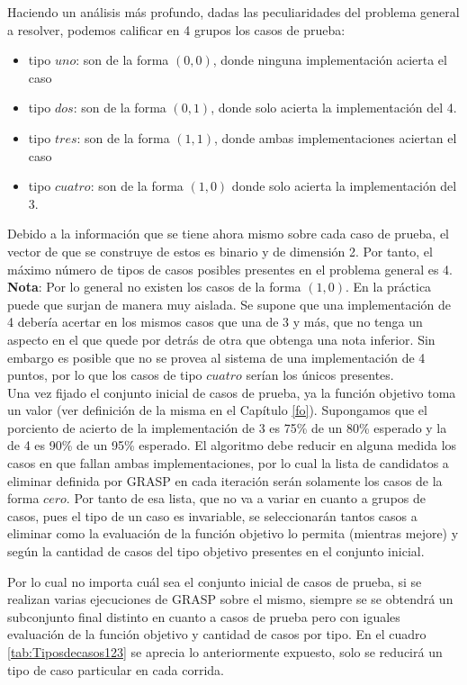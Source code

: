 \documentclass[a4paper,12pt]{book}
\begin{document}
	Haciendo un análisis más profundo, dadas las peculiaridades del problema general a resolver, podemos calificar en 4 grupos los casos de prueba:
	\begin{itemize}
		\item tipo $uno$: son de la forma $(0, 0)$, donde ninguna implementación acierta el caso
		\item tipo $dos$: son de la forma $(0, 1)$, donde solo acierta la implementación del 4.
		\item tipo $tres$: son de la forma $(1, 1)$, donde ambas implementaciones aciertan el caso
		\item tipo $cuatro$: son de la forma $(1, 0)$ donde solo acierta la implementación del 3.
	\end{itemize}

	Debido a la información que se tiene ahora mismo sobre cada caso de prueba, el vector de que se construye de estos es binario y de dimensión 2. Por tanto, el máximo número de tipos de casos posibles presentes en el problema general es 4.\\

	\textbf{Nota}: Por lo general no existen los casos de la forma $(1, 0)$. En la práctica puede que surjan de manera muy aislada. Se supone que una implementación de 4 debería acertar en los mismos casos que una de 3 y más, que no tenga un aspecto en el que quede por detrás de otra que obtenga una nota inferior. Sin embargo es posible que no se provea al sistema de una implementación de 4 puntos, por lo que los casos de tipo $cuatro$ serían los únicos presentes.\\
 
 	Una vez fijado el conjunto inicial de casos de prueba, ya la función objetivo toma un valor (ver definición de la misma en el Capítulo \ref{fo}). Supongamos que el porciento de acierto de la implementación de 3 es 75\% de un 80\% esperado y la de 4 es 90\% de un 95\% esperado. El algoritmo debe reducir en alguna medida los casos en que fallan ambas implementaciones, por lo cual la lista de candidatos a eliminar definida por GRASP en cada iteración serán solamente los casos de la forma $cero$. Por tanto de esa lista, que no va a variar en cuanto a grupos de casos, pues el tipo de un caso es invariable, se seleccionarán tantos casos a eliminar como la evaluación de la función objetivo lo permita (mientras mejore) y según la cantidad de casos del tipo objetivo presentes en el conjunto inicial.
 	
 	Por lo cual no importa cuál sea el conjunto inicial de casos de prueba, si se realizan varias ejecuciones de GRASP sobre el mismo, siempre se se obtendrá un subconjunto final distinto en cuanto a casos de prueba pero con iguales evaluación de la función objetivo y cantidad de casos por tipo. En el cuadro \ref{tab:Tiposdecasos123} se aprecia lo anteriormente expuesto, solo se reducirá un tipo de caso particular en cada corrida. \\
 	
\end{document}
